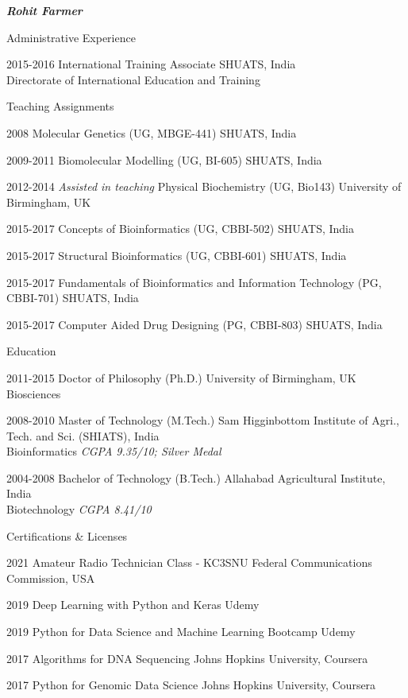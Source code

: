 \documentclass[10pt]{article}
\begin{document}
\begin{cv}{\huge \it \bfseries Rohit Farmer}
\begin{cvlist}{Administrative Experience}
	\item[2015-2016] International Training Associate \hfill SHUATS, India \\  \hspace*{\fill} Directorate of International Education and Training
\end{cvlist}

\begin{cvlist}{Teaching Assignments}
	\item[2008] Molecular Genetics (UG, MBGE-441) \hfill SHUATS, India 
	\item[2009-2011] Biomolecular Modelling (UG, BI-605)  \hfill SHUATS, India
	\item[2012-2014] \emph{Assisted in teaching} Physical Biochemistry (UG, Bio143) \hfill University of Birmingham, UK
	\item[2015-2017] Concepts of Bioinformatics (UG, CBBI-502) \hfill SHUATS, India 
	\item[2015-2017] Structural Bioinformatics (UG, CBBI-601)  \hfill SHUATS, India 
	\item[2015-2017] Fundamentals of Bioinformatics and Information Technology (PG, CBBI-701) \hfill SHUATS, India
	\item[2015-2017] Computer Aided Drug Designing (PG, CBBI-803) \hfill SHUATS, India
\end{cvlist}

\begin{cvlist}{Education}
	\item[2011-2015] Doctor of Philosophy (Ph.D.) \hfill University of Birmingham, UK \\ Biosciences
	\item[2008-2010] Master of Technology (M.Tech.) \hfill Sam Higginbottom Institute of Agri., Tech. and Sci. (SHIATS), India  \\ Bioinformatics \emph{CGPA 9.35/10; Silver Medal}
	\item[2004-2008] Bachelor of Technology (B.Tech.) \hfill Allahabad Agricultural Institute, India  \\ Biotechnology \emph{CGPA 8.41/10}
\end{cvlist}

\begin{cvlist}{Certifications \& Licenses}
    \item[2021] Amateur Radio Technician Class - KC3SNU \hfill Federal Communications Commission, USA
    \item[2019] Deep Learning with Python and Keras \hfill Udemy
    \item[2019] Python for Data Science and Machine Learning Bootcamp \hfill Udemy
    \item[2017] Algorithms for DNA Sequencing \hfill Johns Hopkins University, Coursera
	\item[2017] Python for Genomic Data Science \hfill Johns Hopkins University, Coursera
\end{cvlist}


\end{cv}
\end{document}

